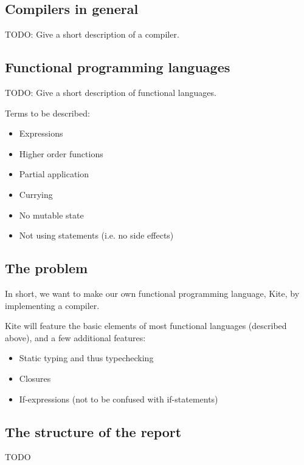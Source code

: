 \subsection{Compilers in general}
TODO: Give a short description of a compiler.

\subsection{Functional programming languages}
TODO: Give a short description of functional languages.

Terms to be described:
\begin{itemize}
\item Expressions
\item Higher order functions
\item Partial application
\item Currying
\item No mutable state
\item Not using statements (i.e. no side effects)

\end{itemize}

\subsection{The problem}
In short, we want to make our own functional programming language, Kite, by implementing a compiler.


Kite will feature the basic elements of most functional languages (described above), and a few additional features:

\begin{itemize}

\item Static typing and thus typechecking
\item Closures
\item If-expressions (not to be confused with if-statements)

\end{itemize}

\subsection{The structure of the report}
TODO

